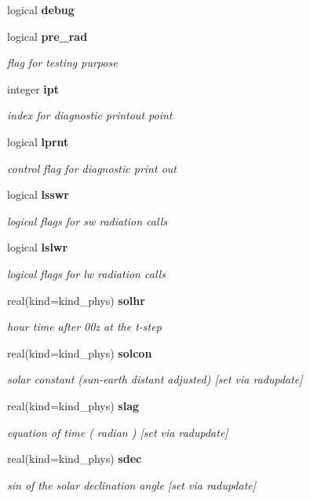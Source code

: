 \begin{DoxyCompactItemize}
logical \textbf{ debug}
\item 
logical \textbf{ pre\+\_\+rad}
\begin{DoxyCompactList}\small\item\em flag for testing purpose \end{DoxyCompactList}\item 
integer \textbf{ ipt}
\begin{DoxyCompactList}\small\item\em index for diagnostic printout point \end{DoxyCompactList}\item 
logical \textbf{ lprnt}
\begin{DoxyCompactList}\small\item\em control flag for diagnostic print out \end{DoxyCompactList}\item 
logical \textbf{ lsswr}
\begin{DoxyCompactList}\small\item\em logical flags for sw radiation calls \end{DoxyCompactList}\item 
logical \textbf{ lslwr}
\begin{DoxyCompactList}\small\item\em logical flags for lw radiation calls \end{DoxyCompactList}\item 
real(kind=kind\+\_\+phys) \textbf{ solhr}
\begin{DoxyCompactList}\small\item\em hour time after 00z at the t-\/step \end{DoxyCompactList}\item 
real(kind=kind\+\_\+phys) \textbf{ solcon}
\begin{DoxyCompactList}\small\item\em solar constant (sun-\/earth distant adjusted) [set via radupdate] \end{DoxyCompactList}\item 
real(kind=kind\+\_\+phys) \textbf{ slag}
\begin{DoxyCompactList}\small\item\em equation of time ( radian ) [set via radupdate] \end{DoxyCompactList}\item 
real(kind=kind\+\_\+phys) \textbf{ sdec}
\begin{DoxyCompactList}\small\item\em sin of the solar declination angle [set via radupdate] \end{DoxyCompactList}\item 

\end{DoxyCompactItemize}
